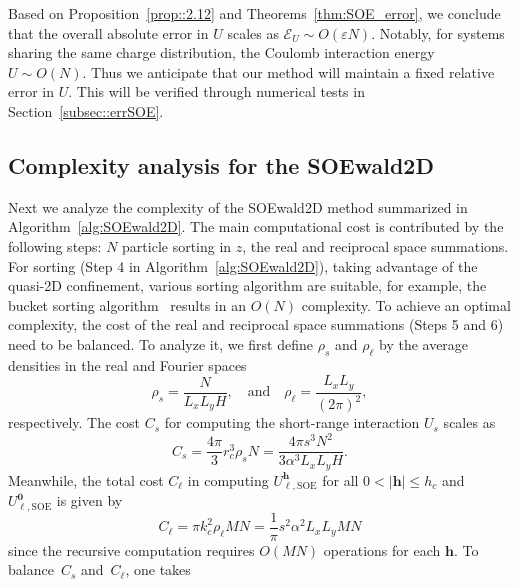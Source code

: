 Based on Proposition~\ref{prop::2.12} and Theorems~\ref{thm:SOE_error}, we conclude that the overall absolute error in $U$ scales as $\mathscr{E}_{U}\sim O(\varepsilon N)$. 
Notably, for systems sharing the same charge distribution, the Coulomb interaction energy $U \sim O(N)$. 
Thus we anticipate that our method will maintain a fixed relative error in $U$. 
This will be verified through numerical tests in Section~\ref{subsec::errSOE}.

\subsection{Complexity analysis for the SOEwald2D}

Next we analyze the complexity of the SOEwald2D method summarized in Algorithm~\ref{alg:SOEwald2D}. 
The main computational cost is contributed by the following steps: $N$ particle sorting in $z$, the real and reciprocal space summations.
For sorting (Step 4 in Algorithm~\ref{alg:SOEwald2D}), taking advantage of the quasi-2D confinement, various sorting algorithm are suitable, for example, the bucket sorting algorithm~\cite{cormen2022introduction} results in an $O(N)$ complexity.
To achieve an optimal complexity, the cost of the real and reciprocal space summations (Steps 5 and 6) need to be balanced. 
To analyze it, we first define $\rho_{s}$ and $\rho_{\ell}$ by the average densities in the real and Fourier spaces 
\begin{equation}
	\rho_{s}=\frac{N}{L_x L_y H},\quad \text{and} \quad \rho_{\ell}=\frac{L_xL_y}{(2\pi)^2},
\end{equation}
respectively.
The cost $C_s$ for computing the short-range interaction $U_{s}$ scales as
\begin{equation}\label{eq::cs}
	C_{s}=\frac{4\pi}{3}r_c^3\rho_{s}N=\frac{4\pi s^3N^2}{3\alpha^3 L_x L_y H}.
\end{equation}
Meanwhile, the total cost $ C_{\ell}$ in computing $U_{\ell,\text{SOE}}^{\bm{h}}$ for all $0<|\bm{h}|\leq h_c$ and $U_{\ell,\text{SOE}}^{\bm{0}}$ is given by
\begin{equation}\label{eq::cll}
	C_{\ell} = \pi k_c^2\rho_{\ell}MN = \frac{1}{\pi}s^2 \alpha^2 L_x L_y M N
\end{equation}
since the recursive computation requires $O(MN)$ operations for each $\bm{h}$. 
To balance~$C_{s}$ and~$C_{\ell}$, one takes
